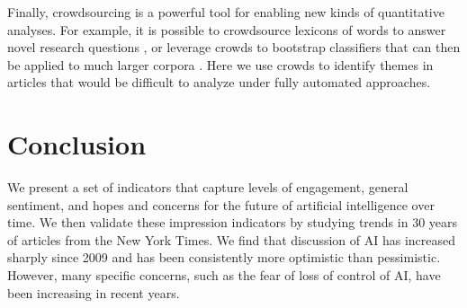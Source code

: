 \documentclass[letterpaper]{article}
\begin{document}
Finally, crowdsourcing is a powerful tool for enabling new kinds of quantitative analyses. For example, it is possible to crowdsource lexicons of words to answer novel research questions \cite{empath}, or leverage crowds to bootstrap classifiers that can then be applied to much larger corpora \cite{politeness,dogmatism}. Here we use crowds to identify themes in articles that would be difficult to analyze under fully automated approaches.

\section{Conclusion}
We present a set of indicators that capture levels of engagement, general sentiment, and hopes and concerns for the future of artificial intelligence over time. We then validate these impression indicators by studying trends in 30 years of articles from the New York Times. We find that discussion of AI has increased sharply since 2009 and has been consistently more optimistic than pessimistic. However, many specific concerns, such as the fear of loss of control of AI, have been increasing in recent years.
\end{document}
